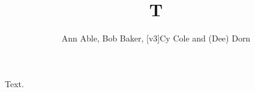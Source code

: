 \documentclass{llncs}
\begin{document}
\title{T}
\author{Ann Able, Bob Baker, [v3]{Cy Cole} and (Dee) Dorn}
\maketitle
Text.
\end{document}
